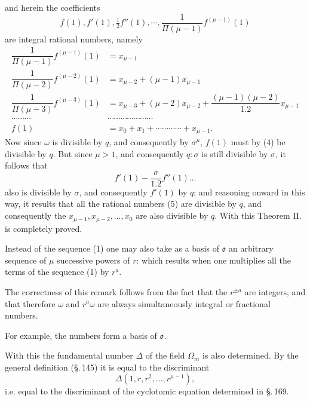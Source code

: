 and herein the coefficients
\[
f(1), f'(1), \tfrac12 f''(1), \cdots, \dfrac{1}{\Pi(\mu-1)} f^{(\mu-1)}(1)
\]
are integral rational numbers, namely
\begin{align*}
\dfrac{1}{\Pi(\mu-1)} f^{(\mu-1)}(1) &= x_{\mu-1} \\[6pt]
\dfrac{1}{\Pi(\mu-2)} f^{(\mu-2)}(1) &= x_{\mu-2}+(\mu-1)x_{\mu-1} \\[6pt]
\dfrac{1}{\Pi(\mu-3)} f^{(\mu-3)}(1) &= x_{\mu-3}+(\mu-2)x_{\mu-2}+\dfrac{(\mu-1)(\mu-2)}{1.2}x_{\mu-1} \tag{5}\\[6pt]
\cdots\cdots\cdots &\cdots\cdots\cdots\cdots\cdots\cdots\cdots \\[6pt]
f(1) &= x_0+x_1+\cdots\cdots\cdots\cdots+x_{\mu-1}.
\end{align*}
Now since $\omega$ is divisible by $q$, and consequently by $\sigma^\mu$,
$f(1)$ must by (4) be divisible by $q$. But since $\mu>1$, and
consequently $q:\sigma$ is still divisible by $\sigma$, it follows that
\[
f'(1) - \dfrac{\sigma}{1.2} f''(1) \ldots
\]
also is divisible by $\sigma$, and consequently $f'(1)$ by $q$; and reasoning
onward in this way, it results that all the rational
numbers (5) are divisible by $q$, and consequently the
$x_{\mu-1}, x_{\mu-2}, \ldots, x_0$ are also divisible by $q$. With this Theorem II. is completely proved.

Instead of the sequence (1) one may also take as a basis of $\mathfrak{o}$ an
arbitrary sequence of $\mu$ successive powers of $r$:
which results when one multiplies all the terms of the sequence (1)
by $r^a$.

The correctness of this remark follows from the fact that
the $r^{\pm a}$ are integers, and that therefore $\omega$ and $r^a\omega$ are always simultaneously integral or fractional numbers.

For example, the numbers
form a basis of $\mathfrak{o}$.

With this the fundamental number $\Delta$ of the field $\Omega_m$ is also determined.
By the general definition (\S.\,145) it is equal to the discriminant %
\[
\Delta(1, r, r^2, \ldots, r^{\mu-1}),
\]
i.e. equal to the discriminant of the cyclotomic equation determined in \S.\,169.
